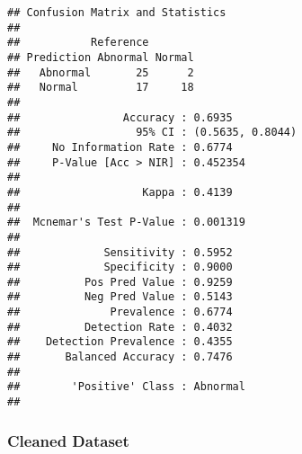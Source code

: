\documentclass[
]{article}
\newenvironment{Shaded}{\begin{snugshade}}{\end{snugshade}}
\newcommand{\CommentTok}[1]{\textcolor[rgb]{0.56,0.35,0.01}{\textit{#1}}}
\newcommand{\DataTypeTok}[1]{\textcolor[rgb]{0.13,0.29,0.53}{#1}}
\newcommand{\KeywordTok}[1]{\textcolor[rgb]{0.13,0.29,0.53}{\textbf{#1}}}
\newcommand{\NormalTok}[1]{#1}
\newcommand{\OperatorTok}[1]{\textcolor[rgb]{0.81,0.36,0.00}{\textbf{#1}}}
\newcommand{\OtherTok}[1]{\textcolor[rgb]{0.56,0.35,0.01}{#1}}
\newcommand{\StringTok}[1]{\textcolor[rgb]{0.31,0.60,0.02}{#1}}
\begin{document}
\begin{verbatim}
## Confusion Matrix and Statistics
## 
##           Reference
## Prediction Abnormal Normal
##   Abnormal       25      2
##   Normal         17     18
##                                           
##                Accuracy : 0.6935          
##                  95% CI : (0.5635, 0.8044)
##     No Information Rate : 0.6774          
##     P-Value [Acc > NIR] : 0.452354        
##                                           
##                   Kappa : 0.4139          
##                                           
##  Mcnemar's Test P-Value : 0.001319        
##                                           
##             Sensitivity : 0.5952          
##             Specificity : 0.9000          
##          Pos Pred Value : 0.9259          
##          Neg Pred Value : 0.5143          
##              Prevalence : 0.6774          
##          Detection Rate : 0.4032          
##    Detection Prevalence : 0.4355          
##       Balanced Accuracy : 0.7476          
##                                           
##        'Positive' Class : Abnormal        
## 
\end{verbatim}

\hypertarget{cleaned-dataset-1}{%
\subsubsection{Cleaned Dataset}\label{cleaned-dataset-1}}

\begin{Shaded}
\end{Shaded}
\end{document}
